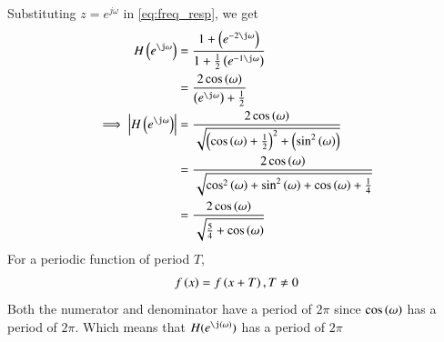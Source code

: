 \documentclass[journal,12pt,twocolumn]{IEEEtran}
\theoremstyle{remark}
\renewcommand\thesection{\arabic{section}}
\numberwithin{equation}{subsection}
\begin{document}
\begin{enumerate}[label=\thesection.\arabic*]




Substituting $z = e^{j \omega}$ in \eqref{eq:freq_resp}, we get
\begin{align}
	H\brak{e^{\j \omega}} &=\frac{1 + \brak{e^{-2\j \omega}}}{1 + \frac{1}{2}\brak{e^{-1\j \omega}}}\\
	&=\frac{2\cos\brak{\omega}}{\brak{e^{\j \omega}} + \frac{1}{2}}\\
	\implies \abs{H\brak{e^{\j \omega}}} &= \frac{2\cos\brak{\omega}}{\sqrt{\brak{\cos\brak{\omega}+\frac{1}{2}}^{2}+\brak{\sin^2\brak{\omega}}}}\\
&=\frac{2\cos\brak{\omega}}{\sqrt{\cos^2\brak{\omega}+\sin^2\brak{\omega}+\cos\brak{\omega}+\frac{1}{4}}}\\
	&=\frac{2\cos\brak{\omega}}{\sqrt{\frac{5}{4}+\cos\brak{\omega}}}\\
\end{align}
For a periodic function of period $T$,
\begin{align}
	f\left(x\right) = f\left(x+T\right), T \neq 0	 
\end{align}
Both the numerator and denominator have a period of $2\pi$ since $\cos\left(\omega\right)$ has a period of $2\pi$. Which means that $H(e^{\j (\omega)})$ has a period of $2\pi$


\end{enumerate}
\end{document}
